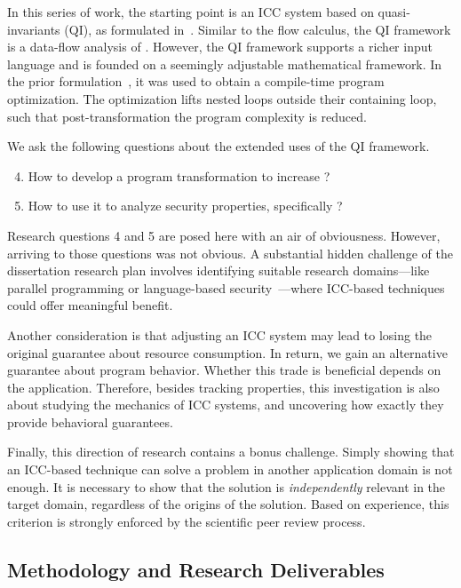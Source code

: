 In this series of work, the starting point is an ICC system based on
quasi-invariants (QI), as formulated in~\cite{moyen20172}. Similar to the flow
calculus, the QI framework is a data-flow analysis of .
However, the QI framework supports a richer input language and is founded on a
seemingly adjustable mathematical framework. In the prior
formulation~\cite{moyen20172}, it was used to obtain a compile-time program
optimization. The optimization lifts nested loops outside their containing
loop, such that post-transformation the program
complexity is reduced.

We ask the following questions about the extended uses of the QI framework.
\begin{enumerate}[label={(RQ\arabic*)},leftmargin=*,labelindent=1em]
\setcounter{enumi}{3}
\item How to develop a program transformation to increase ?
\item How to use it to analyze security properties, specifically
?
\end{enumerate}
Research questions 4 and 5 are posed here with an air of obviousness. However,
arriving to those questions was not obvious. A substantial hidden challenge of
the dissertation research plan involves identifying suitable research
domains---like parallel programming or language-based
security~\cite{sabelfeld2003}---where ICC-based techniques could offer
meaningful benefit.

Another consideration is that adjusting an ICC system may lead to losing the
original guarantee about resource consumption. In return, we gain an alternative
guarantee about program behavior. Whether this trade is beneficial depends on
the application. Therefore, besides tracking properties, this investigation is
also about studying the mechanics of ICC systems, and uncovering how exactly
they provide behavioral guarantees.

Finally, this direction of research contains a bonus challenge. Simply
showing that an ICC-based technique can solve a problem in another application
domain is not enough. It is necessary to show that the solution is
\emph{independently} relevant in the target domain, regardless of the origins of
the solution. Based on experience, this criterion is strongly enforced by the
scientific peer review process.

\subsection{Methodology and Research Deliverables}
\label{sec:aicc-methods}

